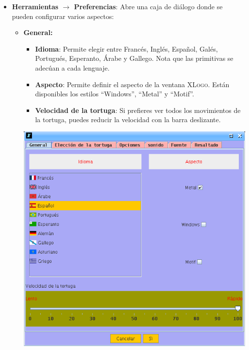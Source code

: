 \begin{itemize}
\begin{center}
      \end{center}
   \item \textbf{Herramientas $\rightarrow$ Preferencias}:\label{Menu_Preferencias}
      Abre una caja de di\'alogo donde se pueden
      configurar varios aspectos:
      \begin{itemize}
         \item \textbf{General:}
            \begin{itemize}
               \item \textbf{Idioma}:  Permite elegir entre
                  Franc\'es, Ingl\'es, Espa\~nol, Gal\'es, Portugu\'es,
                  Esperanto, \'Arabe y Gallego. Nota que las primitivas
                  se adec\'uan a cada lenguaje.
               \item \textbf{Aspecto}:  Permite definir el
                  aspecto de la ventana \textsc{XLogo}. Est\'an disponibles los
                  estilos ``Windows'', ``Metal'' y ``Motif''.
               \item \textbf{Velocidad de la tortuga}:
                   Si prefieres ver todos
                  los movimientos de la tortuga, puedes reducir la velocidad
                  con la barra deslizante. 
            \end{itemize}
            \begin{center}
               \includegraphics[scale=0.3]{Imagenes/03_Opciones-Menu/Preferencias_01.png}

\end{center}
\end{itemize}
\end{itemize}
